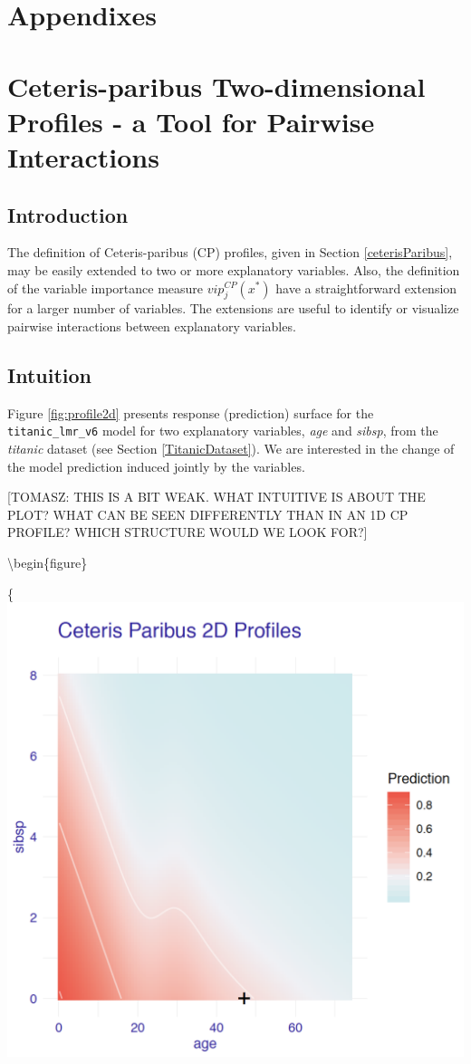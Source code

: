 \documentclass[12pt,]{krantz}
\theoremstyle{definition}
\theoremstyle{definition}
\theoremstyle{definition}
\theoremstyle{remark}
\begin{document}
\hypertarget{appendixes}{%
\section*{Appendixes}\label{appendixes}}

\hypertarget{ceterisParibus2d}{%
\section{Ceteris-paribus Two-dimensional Profiles - a Tool for Pairwise
Interactions}\label{ceterisParibus2d}}

\hypertarget{ceterisParibus2dIntro}{%
\subsection{Introduction}\label{ceterisParibus2dIntro}}

The definition of Ceteris-paribus (CP) profiles, given in Section
\ref{ceterisParibus}, may be easily extended to two or more explanatory
variables. Also, the definition of the variable importance measure
\(vip^{CP}_j(x^*)\) have a straightforward extension for a larger number
of variables. The extensions are useful to identify or visualize
pairwise interactions between explanatory variables.

\hypertarget{ceterisParibus2dIntuition}{%
\subsection{Intuition}\label{ceterisParibus2dIntuition}}

Figure \ref{fig:profile2d} presents response (prediction) surface for
the \texttt{titanic\_lmr\_v6} model for two explanatory variables,
\emph{age} and \emph{sibsp}, from the \emph{titanic} dataset (see
Section \ref{TitanicDataset}). We are interested in the change of the
model prediction induced jointly by the variables.

{[}TOMASZ: THIS IS A BIT WEAK. WHAT INTUITIVE IS ABOUT THE PLOT? WHAT
CAN BE SEEN DIFFERENTLY THAN IN AN 1D CP PROFILE? WHICH STRUCTURE WOULD
WE LOOK FOR?{]}

\textbackslash{}begin\{figure\}

\{\centering \includegraphics[width=0.7\linewidth]{figure/profile_2d}
\end{document}
